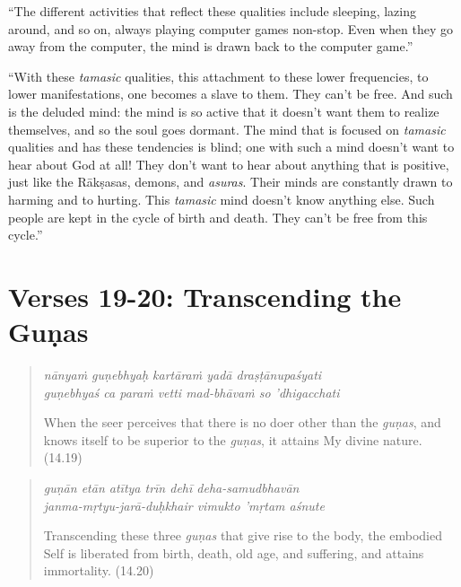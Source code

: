 \documentclass[12pt, twoside, openright]{memoir}
\begin{document}
\enquote{The different activities that reflect these qualities include sleeping, lazing around, and so on, always playing computer games non-stop. Even when they go away from the computer, the mind is drawn back to the computer game.}

\enquote{With these \textit{tamasic} qualities, this attachment to these lower frequencies, to lower manifestations, one becomes a slave to them. They can’t be free. And such is the deluded mind: the mind is so active that it doesn’t want them to realize themselves, and so the soul goes dormant. The mind that is focused on \textit{tamasic} qualities and has these tendencies is blind; one with such a mind doesn’t want to hear about God at all! They don’t want to hear about anything that is positive, just like the Rākṣasas, demons, and \textit{asuras}. Their minds are constantly drawn to harming and to hurting. This \textit{tamasic} mind doesn’t know anything else. Such people are kept in the cycle of birth and death. They can’t be free from this cycle.}

\section{Verses 19-20: Transcending the Guṇas}\label{sec-verses-19-20-transcending-the-gunas}


\par
\begin{verse}
\textit{nānyaṁ guṇebhyaḥ kartāraṁ yadā draṣṭānupaśyati} \\
\textit{guṇebhyaś ca paraṁ vetti mad-bhāvaṁ so ’dhigacchati}

\noindent When the seer perceives that there is no doer other than the \textit{guṇas}, and knows itself to be superior to the \textit{guṇas}, it attains My divine nature. (14.19)
\end{verse}
\par



\par
\begin{verse}
\textit{guṇān etān atītya trīn dehī deha-samudbhavān} \\
\textit{janma-mṛtyu-jarā-duḥkhair vimukto ’mṛtam aśnute}

\noindent Transcending these three \textit{guṇas} that give rise to the body, the embodied Self is liberated from birth, death, old age, and suffering, and attains immortality. (14.20)
\end{verse}
\par
\end{document}
